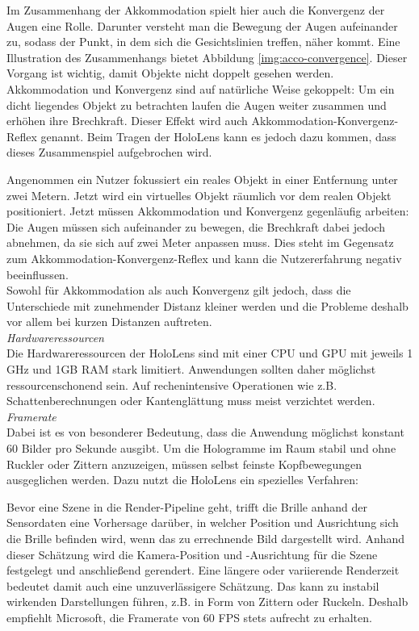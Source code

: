 \par
\noindent\hspace*{5mm}
Im Zusammenhang der Akkommodation spielt hier auch die Konvergenz der Augen eine Rolle. Darunter versteht man die Bewegung der Augen aufeinander zu, sodass der Punkt, in dem sich die Gesichtslinien treffen, näher kommt. Eine Illustration des Zusammenhangs bietet Abbildung \ref{img:acco-convergence}. Dieser Vorgang ist wichtig, damit Objekte nicht doppelt gesehen werden. Akkommodation und Konvergenz sind auf natürliche Weise gekoppelt: Um ein dicht liegendes Objekt zu betrachten laufen die Augen weiter zusammen und erhöhen ihre Brechkraft. Dieser Effekt wird auch Akkommodation-Konvergenz-Reflex genannt. Beim Tragen der HoloLens kann es jedoch dazu kommen, dass dieses Zusammenspiel aufgebrochen wird.
\par
\noindent\hspace*{5mm}
Angenommen ein Nutzer fokussiert ein reales Objekt in einer Entfernung unter zwei Metern. Jetzt wird ein virtuelles Objekt räumlich vor dem realen Objekt positioniert. Jetzt müssen Akkommodation und Konvergenz gegenläufig arbeiten: Die Augen müssen sich aufeinander zu bewegen, die Brechkraft dabei jedoch abnehmen, da sie sich auf zwei Meter anpassen muss. Dies steht im Gegensatz zum Akkommodation-Konvergenz-Reflex und kann die Nutzererfahrung negativ beeinflussen.\\

Sowohl für Akkommodation als auch Konvergenz gilt jedoch, dass die Unterschiede mit zunehmender Distanz kleiner werden und die Probleme deshalb vor allem bei kurzen Distanzen auftreten.\\

\textit{Hardwareressourcen}\\
Die Hardwareressourcen der HoloLens sind mit einer CPU und GPU mit jeweils 1 GHz und 1GB RAM stark limitiert. Anwendungen sollten daher möglichst ressourcenschonend sein. Auf rechenintensive Operationen wie z.B. Schattenberechnungen oder Kantenglättung muss meist verzichtet werden.\\

\textit{Framerate}\\
Dabei ist es von besonderer Bedeutung, dass die Anwendung möglichst konstant 60 Bilder pro Sekunde ausgibt. Um die Hologramme im Raum stabil und ohne Ruckler oder Zittern anzuzeigen, müssen selbst feinste Kopfbewegungen ausgeglichen werden. Dazu nutzt die HoloLens ein spezielles Verfahren:
\par
\noindent\hspace*{5mm}
Bevor eine Szene in die Render-Pipeline geht, trifft die Brille anhand der Sensordaten eine Vorhersage darüber, in welcher Position und Ausrichtung sich die Brille befinden wird, wenn das zu errechnende Bild dargestellt wird. Anhand dieser Schätzung wird die Kamera-Position und -Ausrichtung für die Szene festgelegt und anschließend gerendert. Eine längere oder variierende Renderzeit bedeutet damit auch eine unzuverlässigere Schätzung. Das kann zu instabil wirkenden Darstellungen führen, z.B. in Form von Zittern oder Ruckeln. Deshalb empfiehlt Microsoft, die Framerate von 60 FPS stets aufrecht zu erhalten.\\

